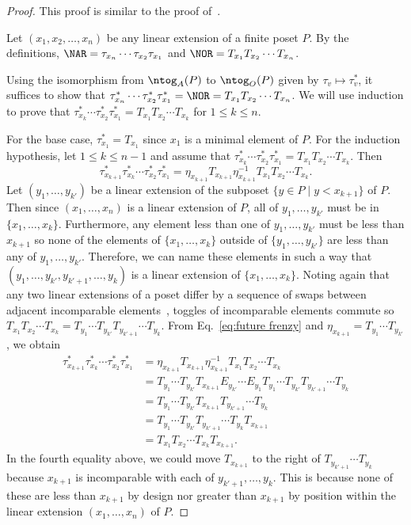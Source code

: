 \begin{proof}
This proof is similar to the proof
of~\cite[Theorem 3.21]{antichain-toggling}.

Let $(x_1,x_2,\dots,x_n)$ be any linear extension of a finite poset $P$. By the definitions,
$\NAR=\tau_{x_n}\cdots \tau_{x_2}\tau_{x_1}$
and
$\NOR=T_{x_1} T_{x_2} \cdots T_{x_n}$.

Using the isomorphism from $\ntog_A(P)$ to $\ntog_O(P)$ given by $\tau_v \mapsto \tau_v^*$,
it suffices to show that
$\tau_{x_n}^*\cdots \tau_{x_2}^* \tau_{x_1}^*=\NOR = T_{x_1} T_{x_2} \cdots T_{x_n}$.
We will use induction to prove that $\tau_{x_k}^*\cdots \tau_{x_2}^* \tau_{x_1}^*
=T_{x_1} T_{x_2} \cdots T_{x_k}$ for $1\leq k\leq n$.

For the base case, $\tau_{x_1}^*=T_{x_1}$ since $x_1$ is a minimal element of $P$.
For the induction hypothesis, let $1\leq k\leq n-1$ and assume that
$\tau_{x_k}^*\cdots \tau_{x_2}^* \tau_{x_1}^*
=T_{x_1} T_{x_2} \cdots T_{x_k}$.
Then 
\begin{equation}\label{eq:future frenzy}
\tau_{x_{k+1}}^*\tau_{x_k}^*\cdots \tau_{x_2}^* \tau_{x_1}^*
= \eta_{x_{k+1}} T_{x_{k+1}} \eta_{x_{k+1}}^{-1} T_{x_1} T_{x_2} \cdots T_{x_k}.
\end{equation}
Let $(y_1,\dots,y_{k'})$ be a linear extension of the subposet $\{y\in P \;|\; y<x_{k+1}\}$ of $P$.
Then since $(x_1,\dots,x_n)$ is a linear extension of $P$, all of $y_1,\dots,y_{k'}$ must be in $\{x_1,\dots,x_k\}$.
Furthermore, any element less than one of $y_1,\dots,y_{k'}$ must be less than $x_{k+1}$ so none of the elements of $\{x_1,\dots,x_k\}$ outside of $\{y_1,\dots,y_{k'}\}$ are less than any of $y_1,\dots,y_{k'}$.
Therefore, we can name these elements in such a way that $(y_1,\dots,y_{k'}, y_{k'+1}, \dots, y_k)$ is a linear extension of $\{x_1,\dots,x_k\}$.
Noting again that any two linear extensions of a poset differ by a sequence of swaps between
adjacent incomparable elements~\cite{etienne-84}, 
toggles of incomparable elements commute so $T_{x_1}T_{x_2}\cdots T_{x_k} = T_{y_1}\cdots T_{y_{k'}}T_{y_{k'+1}}\cdots T_{y_k}$.
From Eq.~\eqref{eq:future frenzy} and $\eta_{x_{k+1}}=T_{y_1}\cdots T_{y_{k'}}$, we obtain
\begin{align*}
\tau_{x_{k+1}}^*\tau_{x_k}^*\cdots \tau_{x_2}^* \tau_{x_1}^* &=
\eta_{x_{k+1}} T_{x_{k+1}} \eta_{x_{k+1}}^{-1}
T_{x_1} T_{x_2} \cdots T_{x_k}
\\&=
T_{y_1}\cdots T_{y_{k'}} T_{x_{k+1}} E_{y_{k'}}\cdots E_{y_1} T_{y_1}\cdots T_{y_{k'}}T_{y_{k'+1}}\cdots T_{y_k}
\\&=
T_{y_1}\cdots T_{y_{k'}} T_{x_{k+1}} T_{y_{k'+1}}\cdots T_{y_k}
\\&=
T_{y_1}\cdots T_{y_{k'}} T_{y_{k'+1}}\cdots T_{y_k} T_{x_{k+1}}
\\&=
T_{x_1} T_{x_2} \cdots T_{x_k} T_{x_{k+1}}.
\end{align*}
In the fourth equality above, we could move $T_{x_{k+1}}$ to the right of $T_{y_{k'+1}}\cdots T_{y_k}$ because $x_{k+1}$ is incomparable with each of $y_{k'+1},\dots, y_k$. This is because none of these are less than $x_{k+1}$ by design nor greater than $x_{k+1}$ by position within the linear extension $(x_1,\dots,x_n)$ of $P$.


\end{proof}
